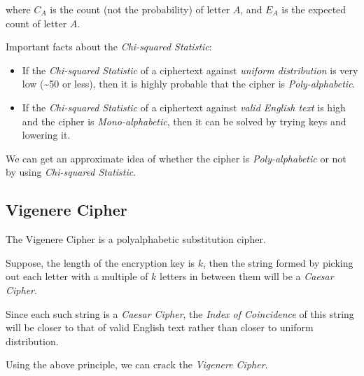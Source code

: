 \documentclass[10pt,twoside]{article}
\begin{document}
where $C_A$ is the count (not the probability) of letter $A$, and $E_A$ is the expected count of letter $A$. \newline

Important facts about the \textit{Chi-squared Statistic}:
\begin{itemize}
  \setlength\itemsep{0em}
  \item If the \textit{Chi-squared Statistic} of a ciphertext against \textit{uniform distribution} is very low (\textasciitilde 50 or less), then it is highly probable that the cipher is \textit{Poly-alphabetic}.
  \item If the \textit{Chi-squared Statistic} of a ciphertext against \textit{valid English text} is high and the cipher is \textit{Mono-alphabetic}, then it can be solved by trying keys and lowering it.
\end{itemize}

We can get an approximate idea of whether the cipher is \textit{Poly-alphabetic} or not by using \textit{Chi-squared Statistic}.

\subsection{Vigenere Cipher} \label{vc}
The Vigenere Cipher is a polyalphabetic substitution cipher. \newline

Suppose, the length of the encryption key is $k$, then the string formed by picking out each letter with a multiple of $k$ letters in between them will be a \textit{Caesar Cipher}. \newline

Since each such string is a \textit{Caesar Cipher}, the \textit{Index of Coincidence} of this string will be closer to that of valid English text rather than closer to uniform distribution. \newline

Using the above principle, we can crack the \textit{Vigenere Cipher}.



\end{document}
